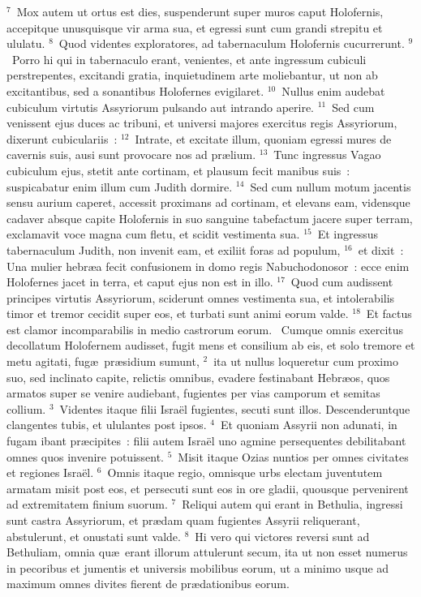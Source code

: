 ${}^{7}$~Mox autem ut ortus est dies, suspenderunt super muros caput Holofernis, accepitque unusquisque vir arma sua, et egressi sunt cum grandi strepitu et ululatu.
${}^{8}$~Quod videntes exploratores, ad tabernaculum Holofernis cucurrerunt.
${}^{9}$~Porro hi qui in tabernaculo erant, venientes, et ante ingressum cubiculi perstrepentes, excitandi gratia, inquietudinem arte moliebantur, ut non ab excitantibus, sed a sonantibus Holofernes evigilaret.
${}^{10}$~Nullus enim audebat cubiculum virtutis Assyriorum pulsando aut intrando aperire.
${}^{11}$~Sed cum venissent ejus duces ac tribuni, et universi majores exercitus regis Assyriorum, dixerunt cubiculariis~:
${}^{12}$~Intrate, et excitate illum, quoniam egressi mures de cavernis suis, ausi sunt provocare nos ad pr\ae lium.
${}^{13}$~Tunc ingressus Vagao cubiculum ejus, stetit ante cortinam, et plausum fecit manibus suis~: suspicabatur enim illum cum Judith dormire.
${}^{14}$~Sed cum nullum motum jacentis sensu aurium caperet, accessit proximans ad cortinam, et elevans eam, vidensque cadaver absque capite Holofernis in suo sanguine tabefactum jacere super terram, exclamavit voce magna cum fletu, et scidit vestimenta sua.
${}^{15}$~Et ingressus tabernaculum Judith, non invenit eam, et exiliit foras ad populum,
${}^{16}$~et dixit~: Una mulier hebr\ae a fecit confusionem in domo regis Nabuchodonosor~: ecce enim Holofernes jacet in terra, et caput ejus non est in illo.
${}^{17}$~Quod cum audissent principes virtutis Assyriorum, sciderunt omnes vestimenta sua, et intolerabilis timor et tremor cecidit super eos, et turbati sunt animi eorum valde.
${}^{18}$~Et factus est clamor incomparabilis in medio castrorum eorum.
~Cumque omnis exercitus decollatum Holofernem audisset, fugit mens et consilium ab eis, et solo tremore et metu agitati, fug\ae\ pr\ae sidium sumunt,
${}^{2}$~ita ut nullus loqueretur cum proximo suo, sed inclinato capite, relictis omnibus, evadere festinabant Hebr\ae os, quos armatos super se venire audiebant, fugientes per vias camporum et semitas collium.
${}^{3}$~Videntes itaque filii Isra\"el fugientes, secuti sunt illos. Descenderuntque clangentes tubis, et ululantes post ipsos.
${}^{4}$~Et quoniam Assyrii non adunati, in fugam ibant pr\ae cipites~: filii autem Isra\"el uno agmine persequentes debilitabant omnes quos invenire potuissent.
${}^{5}$~Misit itaque Ozias nuntios per omnes civitates et regiones Isra\"el.
${}^{6}$~Omnis itaque regio, omnisque urbs electam juventutem armatam misit post eos, et persecuti sunt eos in ore gladii, quousque pervenirent ad extremitatem finium suorum.
${}^{7}$~Reliqui autem qui erant in Bethulia, ingressi sunt castra Assyriorum, et pr\ae dam quam fugientes Assyrii reliquerant, abstulerunt, et onustati sunt valde.
${}^{8}$~Hi vero qui victores reversi sunt ad Bethuliam, omnia qu\ae\ erant illorum attulerunt secum, ita ut non esset numerus in pecoribus et jumentis et universis mobilibus eorum, ut a minimo usque ad maximum omnes divites fierent de pr\ae dationibus eorum.


